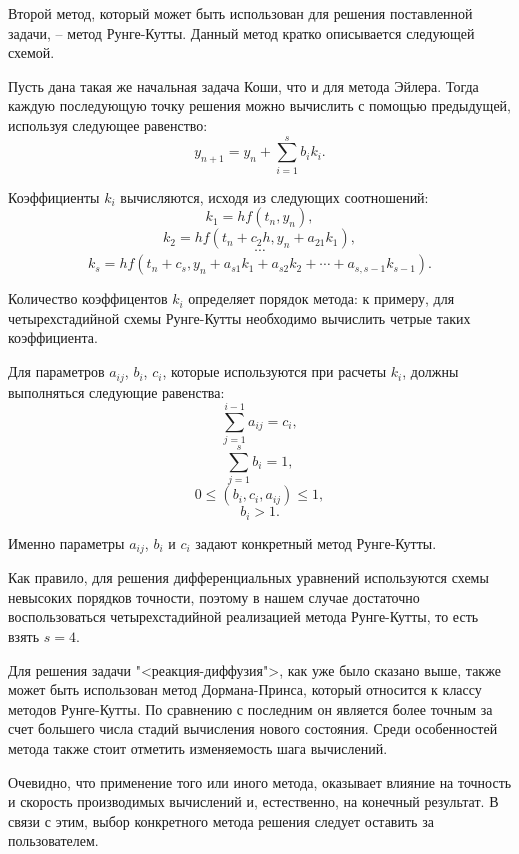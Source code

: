 \documentclass[a4paper, 14pt]{extarticle}
\theoremstyle{definition}
\begin{document}
\par Второй метод, который может быть использован для решения поставленной задачи, -- метод Рунге-Кутты. Данный метод кратко описывается следующей схемой.

\par Пусть дана такая же начальная задача Коши, что и для метода Эйлера. Тогда каждую последующую точку решения можно вычислить с помощью предыдущей, используя следующее равенство:
$$y_{n+1} = y_n + \sum_{i=1}^s b_i k_i.$$

\par Коэффициенты $k_i$ вычисляются, исходя из следующих соотношений:
$$k_1 = hf(t_n, y_n),$$
$$k_2 = hf(t_n + c_2 h, y_n + a_{21}k_1),$$
$$\cdots$$
$$k_s = hf(t_n + c_s, y_n + a_{s1}k_1 + a_{s2}k_2 + \cdots + a_{s,s-1}k_{s-1}).$$

\par Количество коэффицентов $k_i$ определяет порядок метода: к примеру, для четырехстадийной схемы Рунге-Кутты необходимо вычислить четрые таких коэффициента.

\par Для параметров $a_{ij}$, $b_i$, $c_i$, которые используются при расчеты $k_i$, должны выполняться следующие равенства:
$$\sum_{j=1}^{i-1}{a_{ij}} = c_i,$$
$$\sum_{j=1}^s{b_i} = 1,$$
$$0 \le (b_i, c_i, a_{ij}) \le 1,$$
$$b_i > 1.$$

\par Именно параметры $a_{ij}$, $b_i$ и $c_i$ задают конкретный метод Рунге-Кутты.

\par Как правило, для решения дифференциальных уравнений используются схемы невысоких порядков точности, поэтому в нашем случае достаточно воспользоваться четырехстадийной реализацией метода Рунге-Кутты, то есть взять $s = 4$.

\par Для решения задачи "<реакция-диффузия">, как уже было сказано выше, также может быть использован метод Дормана-Принса, который относится к классу методов Рунге-Кутты. По сравнению с последним он является более точным за счет большего числа стадий вычисления нового состояния. Среди особенностей метода также стоит отметить изменяемость шага вычислений.

\par Очевидно, что применение того или иного метода, оказывает влияние на точность и скорость производимых вычислений и, естественно, на конечный результат. В связи с этим, выбор конкретного метода решения следует оставить за пользователем.
\end{document}
